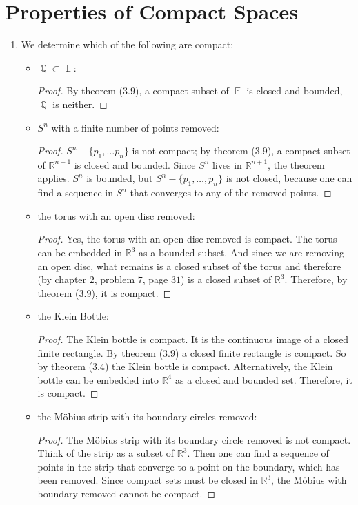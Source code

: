 \documentclass{book}
\DeclareMathOperator*{\Q}{\mathbb{Q}}
\DeclareMathOperator*{\E}{\mathbb{E}}
\begin{document}
\section{Properties of Compact Spaces}
\begin{enumerate}[(1)]
    \item We determine which of the following are compact: 
        \begin{itemize}
            \item $\Q \subset \E$: 
                \begin{proof} By theorem ($3.9$), a compact subset of $\E$ is closed and bounded, $\Q$ is neither.
                \end{proof}

            \item $S^n$ with a finite number of points removed: 
                \begin{proof} $S^n-\{p_1,\dots p_n\}$ is not compact; by theorem ($3.9$), a compact subset of $\mathbb R^{n+1}$ is closed and bounded.  Since $S^n$ lives in $\mathbb R^{n+1}$, the theorem applies.  $S^n$ is bounded, but $S^n-\{p_1,\dots, p_n\}$ is not closed, because one can find a sequence in $S^n$ that converges to any of the removed points.
                \end{proof}

            \item the torus with an open disc removed: 
                \begin{proof} Yes, the torus with an open disc removed is compact.  The torus can be embedded in $\mathbb R^3$ as a bounded subset.  And since we are removing an open disc, what remains is a closed subset of the torus and therefore (by chapter $2$, problem $7$, page $31$) is a closed subset of $\mathbb R^3$. Therefore, by theorem ($3.9$), it is compact.
                \end{proof}

            \item the Klein Bottle: 
                \begin{proof} The Klein bottle is compact.  It is the continuous image of a closed finite rectangle.  By theorem ($3.9$) a closed finite rectangle is compact. So by theorem ($3.4$) the Klein bottle is compact.    Alternatively, the Klein bottle can be embedded into $\mathbb R^4$ as a closed and bounded set.  Therefore, it is compact. 
                \end{proof}

            \item the M\"obius strip with its boundary circles removed: 
                \begin{proof} The M\"obius strip with its boundary circle removed is not compact.  Think of the strip as a subset of $\mathbb R^3$.  Then one can find a sequence of points in the strip that converge to a point on the boundary, which has been removed.  Since compact sets must be closed in $\mathbb R^3$, the M\"obius with boundary removed cannot be compact.
                \end{proof}
        \end{itemize}


\end{enumerate}
\end{document}
